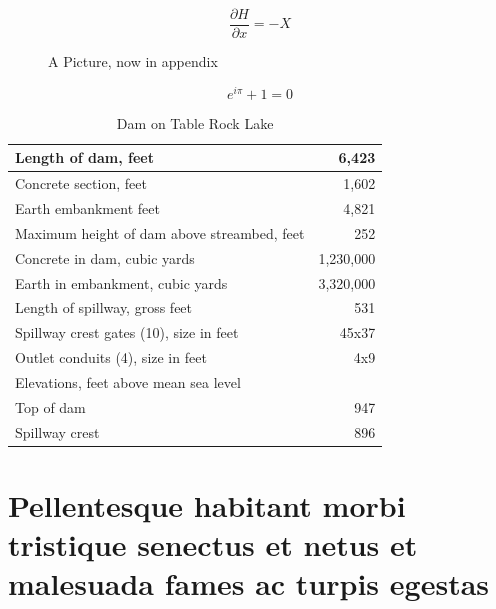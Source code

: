 \documentclass{template/openetcs_report}
\begin{document}
\lipsum[12-16]

\begin{equation}
  \label{eq:C}
  \frac{\partial H}{\partial x} = -X
\end{equation}

\begin{figure}
  \centering
  \caption{A Picture, now in appendix}
  \label{fig:castle1}
\end{figure}

\lipsum[26]
\lipsum[32]

\begin{equation}
  \label{eq:D}
  e^{i\pi} + 1 = 0
\end{equation}

\begin{table}
  \centering
  \caption{Dam on Table Rock Lake}
  \label{tab:Dam}
  \footnotesize\sffamily
  \begin{tabular}{|l|r|}
    \hline
    Length of dam, feet &6,423\\
    \hline
    Concrete section, feet &1,602\\
    \hline
    Earth embankment feet &4,821\\
    \hline
    Maximum height of dam above streambed, feet &252\\
    \hline
    Concrete in dam, cubic yards &1,230,000\\
    \hline
    Earth in embankment, cubic yards &3,320,000\\
    \hline
    Length of spillway, gross feet &531\\
    \hline
    Spillway crest gates (10), size in feet &45x37\\
    \hline
    Outlet conduits (4), size in feet &4x9\\
    \hline
    Elevations, feet above mean sea level & \\
    \hspace{20pt}Top of dam & 947\\
    \hspace{20pt}Spillway crest & 896\\
    \hline
  \end{tabular}
\end{table}

\lipsum[27]

\chapter{Pellentesque habitant
  morbi tristique senectus et netus et malesuada fames ac turpis
  egestas}
\end{document}
